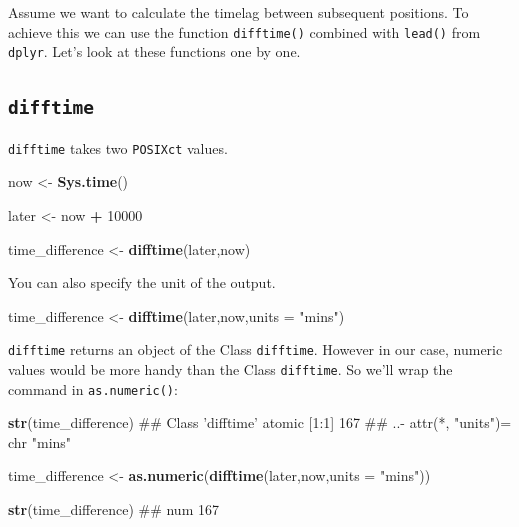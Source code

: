 \documentclass[]{book}
\newenvironment{Shaded}{\begin{snugshade}}{\end{snugshade}}
\newcommand{\KeywordTok}[1]{\textcolor[rgb]{0.13,0.29,0.53}{\textbf{#1}}}
\newcommand{\DataTypeTok}[1]{\textcolor[rgb]{0.13,0.29,0.53}{#1}}
\newcommand{\DecValTok}[1]{\textcolor[rgb]{0.00,0.00,0.81}{#1}}
\newcommand{\StringTok}[1]{\textcolor[rgb]{0.31,0.60,0.02}{#1}}
\newcommand{\OperatorTok}[1]{\textcolor[rgb]{0.81,0.36,0.00}{\textbf{#1}}}
\newcommand{\NormalTok}[1]{#1}
\begin{document}
Assume we want to calculate the timelag between subsequent positions. To
achieve this we can use the function \texttt{difftime()} combined with
\texttt{lead()} from \texttt{dplyr}. Let's look at these functions one
by one.

\subsection{\texorpdfstring{\texttt{difftime}}{difftime}}\label{difftime}

\texttt{difftime} takes two \texttt{POSIXct} values.

\begin{Shaded}
\begin{Highlighting}[]
\NormalTok{now <-}\StringTok{ }\KeywordTok{Sys.time}\NormalTok{()}

\NormalTok{later <-}\StringTok{ }\NormalTok{now }\OperatorTok{+}\StringTok{ }\DecValTok{10000}

\NormalTok{time_difference <-}\StringTok{ }\KeywordTok{difftime}\NormalTok{(later,now)}
\end{Highlighting}
\end{Shaded}

You can also specify the unit of the output.

\begin{Shaded}
\begin{Highlighting}[]
\NormalTok{time_difference <-}\StringTok{ }\KeywordTok{difftime}\NormalTok{(later,now,}\DataTypeTok{units =} \StringTok{"mins"}\NormalTok{)}
\end{Highlighting}
\end{Shaded}

\texttt{difftime} returns an object of the Class \texttt{difftime}.
However in our case, numeric values would be more handy than the Class
\texttt{difftime}. So we'll wrap the command in \texttt{as.numeric()}:

\begin{Shaded}
\begin{Highlighting}[]
\KeywordTok{str}\NormalTok{(time_difference)}
\NormalTok{## Class 'difftime'  atomic [1:1] 167}
\NormalTok{##   ..- attr(*, "units")= chr "mins"}
\end{Highlighting}
\end{Shaded}

\begin{Shaded}
\begin{Highlighting}[]
\NormalTok{time_difference <-}\StringTok{ }\KeywordTok{as.numeric}\NormalTok{(}\KeywordTok{difftime}\NormalTok{(later,now,}\DataTypeTok{units =} \StringTok{"mins"}\NormalTok{))}

\KeywordTok{str}\NormalTok{(time_difference)}
\NormalTok{##  num 167}
\end{Highlighting}
\end{Shaded}
\end{document}

